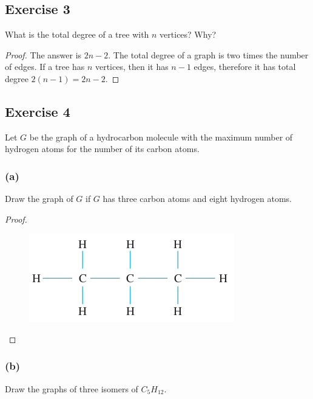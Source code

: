 \documentclass[14pt]{extarticle}
\begin{document}
\subsection{Exercise 3}
What is the total degree of a tree with \(n\) vertices? Why?

\begin{proof}
    The answer is \(2n - 2\). The total degree of a graph is two times the number of edges. If a tree has \(n\) vertices, then
    it has \(n-1\) edges, therefore it has total degree \(2(n-1) = 2n-2\).
\end{proof}

\subsection{Exercise 4}
Let \(G\) be the graph of a hydrocarbon molecule with the maximum number of hydrogen atoms for the number of its carbon
atoms.

\subsubsection{(a)}
Draw the graph of \(G\) if \(G\) has three carbon atoms and eight hydrogen atoms.

\begin{proof}
    \begin{figure}[ht!]
        \centering
        \includegraphics[scale=0.45]{../images/10.4.4.a.png}
    \end{figure}
\end{proof}

\subsubsection{(b)}
Draw the graphs of three isomers of \(C_5H_{12}\).
\end{document}
